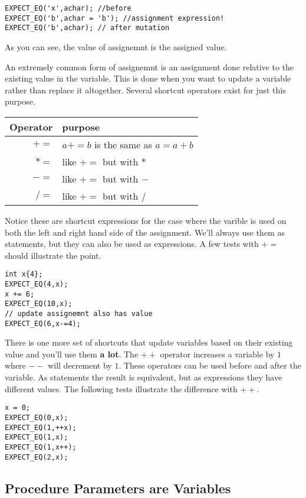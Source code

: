 \documentclass[]{tufte-handout}
\begin{document}
\begin{verbatim}
EXPECT_EQ('x',achar); //before
EXPECT_EQ('b',achar = 'b'); //assignment expression!
EXPECT_EQ('b',achar); // after mutation
\end{verbatim}

As you can see, the value of assignemnt is the assigned value.

An extremely common form of assignemnt is an assignment done relative to the existing value in the variable. This is done when you want to update a variable rather than replace it altogether. Several shortcut operators exist for just this purpose.
\begin{center}
\begin{tabular}{rl}
Operator & purpose \\ \hline
$+=$ & $a+=b$ is the same as $a = a + b$ \\
$*=$ & like $+=$ but with $*$ \\
$-=$ & like $+=$ but with $-$ \\
$/=$ & like $+=$ but with $/$
\end{tabular}
\end{center}

Notice these are shortcut expressions for the case where the varible is used on
both the left and right hand side of the assignment. We'll always use them as statements, but they can also be used as expressions. A few tests with $+=$ should illustrate the point.

\begin{verbatim}
int x{4};
EXPECT_EQ(4,x);
x += 6;
EXPECT_EQ(10,x);
// update assignemnt also has value
EXPECT_EQ(6,x-=4);
\end{verbatim}

There is one more set of shortcuts that update variables based on their existing value and you'll use them \textbf{a lot}. The $++$ operator increases a variable by $1$ where $--$ will decrement by $1$. These operators can be used before and after the variable. As statements the result is equivalent, but as expressions they have different values. The following tests illustrate the difference with $++$.

\begin{verbatim}
x = 0;
EXPECT_EQ(0,x);
EXPECT_EQ(1,++x);
EXPECT_EQ(1,x);
EXPECT_EQ(1,x++);
EXPECT_EQ(2,x);
\end{verbatim}

\subsection{Procedure Parameters are Variables}
\end{document}
